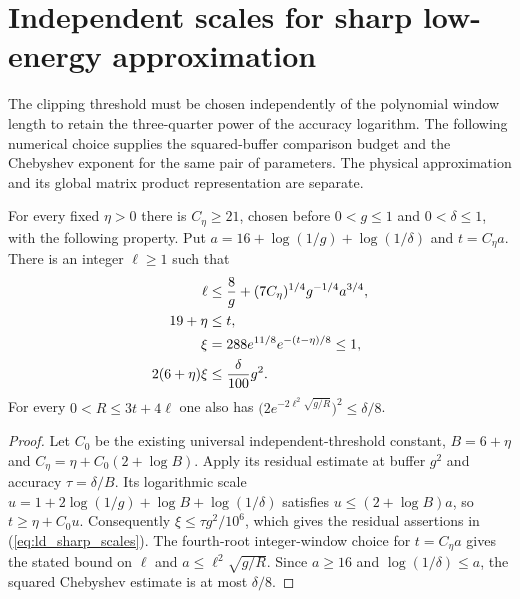 \section{Independent scales for sharp low-energy approximation}

The clipping threshold must be chosen independently of the polynomial
window length to retain the three-quarter power of the accuracy logarithm.
The following numerical choice supplies the squared-buffer comparison budget
and the Chebyshev exponent for the same pair of parameters. The physical
approximation and its global matrix product representation are separate.

\begin{lemma}
    \label{lem:ld_sharp_independent_parameters}
    \leanok
    For every fixed $\eta>0$ there is $C_\eta\ge21$, chosen before
    $0<g\le1$ and $0<\delta\le1$, with the following property.
    Put $a=16+\log(1/g)+\log(1/\delta)$ and $t=C_\eta a$.
    There is an integer $\ell\ge1$ such that
    \begin{align}
        \ell         & \le\frac8g+(7C_\eta)^{1/4}g^{-1/4}a^{3/4},\notag \\
        19+\eta      & \le t,\notag                                     \\
        \xi          & =288e^{11/8}e^{-(t-\eta)/8}\le1,\notag           \\
        2(6+\eta)\xi & \le\frac\delta{100}g^2.
        \label{eq:ld_sharp_scales}
    \end{align}
    For every $0<R\le3t+4\ell$ one also has
    $\bigl(2e^{-2\ell^2\sqrt{g/R}}\bigr)^2\le\delta/8$.
\end{lemma}
\begin{proof}\leanok
    Let $C_0$ be the existing universal independent-threshold constant,
    $B=6+\eta$ and $C_\eta=\eta+C_0(2+\log B)$.
    Apply its residual estimate at buffer $g^2$ and accuracy
    $\tau=\delta/B$. Its logarithmic scale
    $u=1+2\log(1/g)+\log B+\log(1/\delta)$ satisfies
    $u\le(2+\log B)a$, so $t\ge\eta+C_0u$.
    Consequently $\xi\le\tau g^2/10^6$, which gives the residual
    assertions in (\ref{eq:ld_sharp_scales}).
    The fourth-root integer-window choice for $t=C_\eta a$ gives the
    stated bound on $\ell$ and $a\le\ell^2\sqrt{g/R}$.
    Since $a\ge16$ and $\log(1/\delta)\le a$, the squared Chebyshev
    estimate is at most $\delta/8$.
\end{proof}


